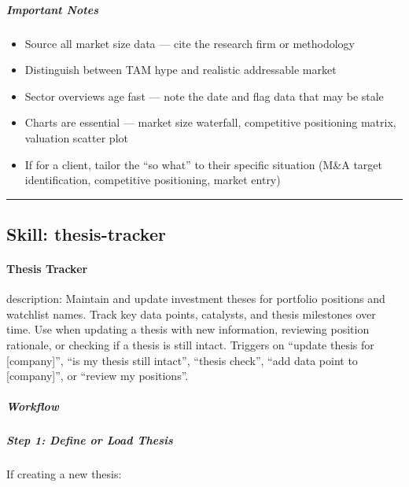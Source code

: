 \documentclass[11pt]{article}
\begin{document}
\subparagraph{Important Notes}\mbox{}\par

\begin{itemize}[leftmargin=*,itemsep=2pt,topsep=2pt]
\item {} Source all market size data — cite the research firm or methodology
\item {} Distinguish between TAM hype and realistic addressable market
\item {} Sector overviews age fast — note the date and flag data that may be stale
\item {} Charts are essential — market size waterfall, competitive positioning matrix, valuation scatter plot
\item {} If for a client, tailor the ``so what'' to their specific situation (M\&A target identification, competitive positioning, market entry)
\end{itemize}

\vspace{0.8em}\hrule\vspace{0.8em}

\subsection{Skill: thesis-tracker}\label{file:skills-thesis-tracker-SKILL-md}

\paragraph{Thesis Tracker}\mbox{}\par

description: Maintain and update investment theses for portfolio positions and watchlist names. Track key data points, catalysts, and thesis milestones over time. Use when updating a thesis with new information, reviewing position rationale, or checking if a thesis is still intact. Triggers on ``update thesis for [company]'', ``is my thesis still intact'', ``thesis check'', ``add data point to [company]'', or ``review my positions''.


\subparagraph{Workflow}\mbox{}\par

\subparagraph{Step 1: Define or Load Thesis}\mbox{}\par

If creating a new thesis:
\end{document}
